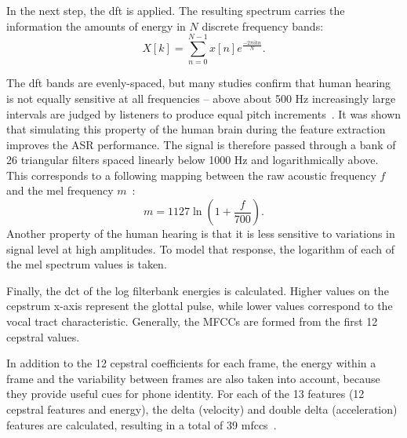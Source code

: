 In the next step, the \gls{dft} is applied. The resulting spectrum carries the information the amounts of energy in $N$ discrete frequency bands:
\begin{equation}
  X[k]=\sum_{n=0}^{N-1}x[n]e^{\frac{-2\pi ikn}{N}}.
\end{equation}

The \gls{dft} bands are evenly-spaced, but many studies confirm that human hearing is not equally sensitive at all frequencies -- above about 500 Hz increasingly large intervals are judged by listeners to produce equal pitch increments~\cite{stevens1937scale, fletcher1938loudness}. It was shown that simulating this property of the human brain during the feature extraction improves the ASR performance. The signal is therefore passed through a bank of 26 triangular filters spaced linearly below 1000 Hz and logarithmically above. This corresponds to a following mapping between the raw acoustic frequency $f$ and the mel frequency $m$~\cite{muda2010voice}:
\begin{equation}
  m=1127\ln(1+\frac{f}{700}).
\end{equation}
Another property of the human hearing is that it is less sensitive to variations in signal level at high amplitudes. To model that response, the logarithm of each of the mel spectrum values is taken.

Finally, the \gls{dct} of the log filterbank energies is calculated. Higher values on the cepstrum x-axis represent the glottal pulse, while lower values correspond to the vocal tract characteristic. Generally, the MFCCs are formed from the first 12 cepstral values.

In addition to the 12 cepstral coefficients for each frame, the energy within a frame and the variability between frames are also taken into account, because they provide useful cues for phone identity. For each of the 13 features (12 cepstral features and energy), the delta (velocity) and double delta (acceleration) features are calculated, resulting in a total of 39 \glspl{mfcc}~\cite{jurafsky2000speech}.

